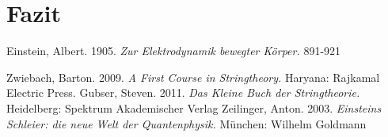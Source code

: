 \documentclass[a4paper, 12pt]{article}
\begin{document}
\section{Fazit}

\begin{thebibliography}{9}

Einstein, Albert. 1905. 
\textit{Zur Elektrodynamik bewegter Körper.}
891-921

Zwiebach, Barton. 2009.
\textit{A First Course in Stringtheory.}
Haryana: Rajkamal Electric Press.
Gubser, Steven. 2011. 
\textit{Das Kleine Buch der Stringtheorie.}
Heidelberg: Spektrum Akademischer Verlag
Zeilinger, Anton. 2003.
\textit{Einsteins Schleier: die neue Welt der Quantenphysik.}
München: Wilhelm Goldmann
\end{thebibliography}
\end{document}
